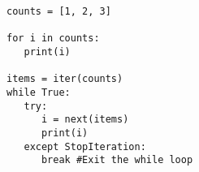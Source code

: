\begin{lstlisting}
counts = [1, 2, 3]

for i in counts:
   print(i)

items = iter(counts)
while True:
   try:
      i = next(items)
      print(i)
   except StopIteration:
      break #Exit the while loop
\end{lstlisting}
